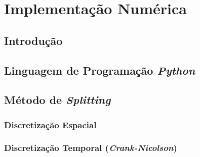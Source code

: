 \chapter{Implementação Numérica}
\label{chapter:cap6}
\section{\textbf{Introdução}}
\section{\textbf{Linguagem de Programação \textit{Python}}}
\section{\textbf{Método de \textit{Splitting}}}
\subsection{Discretização Espacial}
\subsection{Discretização Temporal (\textit{Crank-Nicolson})}